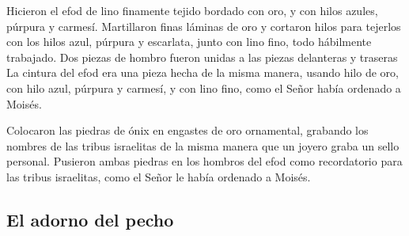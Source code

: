  Hicieron el efod de lino finamente tejido bordado con
oro, y con hilos azules, púrpura y carmesí.  Martillaron
finas láminas de oro y cortaron hilos para tejerlos con los hilos azul,
púrpura y escarlata, junto con lino fino, todo hábilmente trabajado.
 Dos piezas de hombro fueron unidas a las piezas
delanteras y traseras  La cintura del efod era una pieza
hecha de la misma manera, usando hilo de oro, con hilo azul, púrpura y
carmesí, y con lino fino, como el Señor había ordenado a Moisés.

 Colocaron las piedras de ónix en engastes de oro
ornamental, grabando los nombres de las tribus israelitas de la misma
manera que un joyero graba un sello personal.  Pusieron
ambas piedras en los hombros del efod como recordatorio para las tribus
israelitas, como el Señor le había ordenado a Moisés.

\hypertarget{el-adorno-del-pecho}{%
\subsection{El adorno del pecho}\label{el-adorno-del-pecho}}

